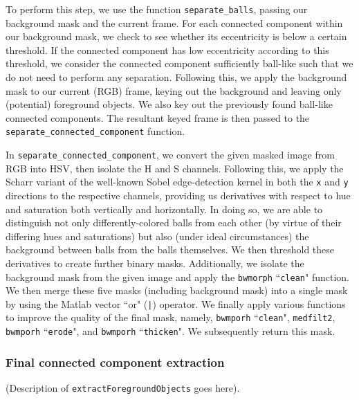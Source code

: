 \documentclass[12pt,a4paper]{article}
\begin{document}
To perform this step, we use the function \texttt{separate\_balls}, passing our background mask and the current frame. For each connected component within our background mask, we check to see whether its eccentricity is below a certain threshold. If the connected component has low eccentricity according to this threshold, we consider the connected component sufficiently ball-like such that we do not need to perform any separation. Following this, we apply the background mask to our current (RGB) frame, keying out the background and leaving only (potential) foreground objects. We also key out the previously found ball-like connected components. The resultant keyed frame is then passed to the \texttt{separate\_connected\_component} function.

In \texttt{separate\_connected\_component}, we convert the given masked image from RGB into HSV, then isolate the H and S channels. Following this, we apply the Scharr variant of the well-known Sobel edge-detection kernel in both the \texttt{x} and \texttt{y} directions to the respective channels, providing us derivatives with respect to hue and saturation both vertically and horizontally. In doing so, we are able to distinguish not only differently-colored balls from each other (by virtue of their differing hues and saturations) but also (under ideal circumstances) the background between balls from the balls themselves. We then threshold these derivatives to create further binary masks. Additionally, we isolate the background mask from the given image and apply the \texttt{bwmorph} ``\texttt{clean}" function. We then merge these five masks (including background mask) into a single mask by using the Matlab vector ``or" (\texttt{|}) operator. We finally apply various functions to improve the quality of the final mask, namely, \texttt{bwmporh} ``\texttt{clean}", \texttt{medfilt2}, \texttt{bwmporh} ``\texttt{erode}", and \texttt{bwmporh} ``\texttt{thicken}". We subsequently return this mask.
\subsubsection{Final connected component extraction}
(Description of \texttt{extractForegroundObjects} goes here).
\end{document}
